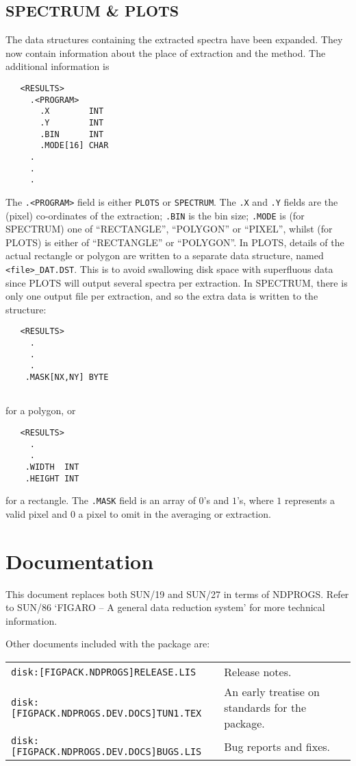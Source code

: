 \subsection{SPECTRUM \& PLOTS}

The data structures containing the extracted spectra have been expanded.
They now contain information about the place of extraction and the method.
The additional information is
\begin{verbatim}
   <RESULTS> 
     .<PROGRAM>
       .X        INT
       .Y        INT
       .BIN      INT
       .MODE[16] CHAR
     .
     .
     .
\end{verbatim}
The {\tt .<PROGRAM>} field is either {\tt PLOTS} or {\tt SPECTRUM}.
The {\tt .X} and {\tt .Y} fields are the (pixel) co-ordinates of the
extraction; {\tt .BIN} is the bin size; {\tt .MODE} is (for SPECTRUM) one of
``RECTANGLE'', ``POLYGON'' or ``PIXEL'', whilst (for PLOTS) is either of
``RECTANGLE'' or ``POLYGON''. In PLOTS, details of the actual rectangle 
or polygon are written to a separate data structure, named {\tt
<file>\_DAT.DST}. This is to avoid swallowing disk space with superfluous data
since PLOTS will output several spectra per extraction.
In SPECTRUM, there is only one output file per extraction, and so the extra
data is written to the structure:
\begin{verbatim}
   <RESULTS> 
     .
     .
     .
    .MASK[NX,NY] BYTE
   
\end{verbatim}
for a polygon, or
\begin{verbatim}
   <RESULTS> 
     .
     .
    .WIDTH  INT
    .HEIGHT INT
\end{verbatim}
for a rectangle. The {\tt .MASK} field is an array of $0$'s and $1$'s, where
$1$ represents a valid pixel and $0$ a pixel to omit in the averaging or
extraction.
              
\section{Documentation}

This document replaces both SUN/19 and SUN/27 in terms of NDPROGS. Refer to
SUN/86 `FIGARO -- A general data reduction system' for more technical 
information.

Other documents included with the package are: 

\vspace{2mm}
\begin{tabular}{ll}
{\tt disk:[FIGPACK.NDPROGS]RELEASE.LIS} 
& Release notes. \\
{\tt disk:[FIGPACK.NDPROGS.DEV.DOCS]TUN1.TEX} 
& An early treatise on standards for the package. \\
{\tt disk:[FIGPACK.NDPROGS.DEV.DOCS]BUGS.LIS}
& Bug reports and fixes.\\
\end{tabular}
\vspace{2mm}
 
